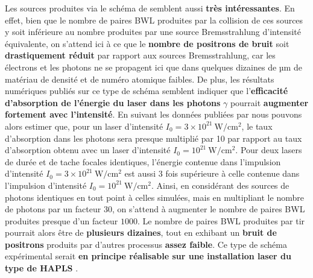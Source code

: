 \begin{refsection}
Les sources produites via le schéma de \cite{huang_2018} semblent aussi \textbf{très intéressantes}. En effet, bien que le nombre de paires BWL produites par la collision de ces sources y soit inférieure au nombre produites par une source Bremsstrahlung d'intensité équivalente, on s'attend ici à ce que le \textbf{nombre de positrons de bruit} soit \textbf{drastiquement réduit} par rapport aux sources Bremsstrahlung, car les électrons et les photons ne se propagent ici que dans quelques dizaines de µm de matériau de densité et de numéro atomique faibles.
De plus, les résultats numériques publiés sur ce type de schéma semblent indiquer que l'\textbf{efficacité d'absorption de l'énergie du laser dans les photons} $\gamma$ pourrait \textbf{augmenter fortement avec l'intensité}.
En suivant les données publiées par \cite{huang_2018} nous pouvons alors estimer que, pour un laser d'intensité $I_0 = 3 \times 10^{21} ~ \si{\W\per\cm^2}$, le taux d'absorption dans les photons sera presque multiplié par 10 par rapport au taux d'absorption obtenu avec un laser d'intensité $I_0 = 10^{21} ~ \si{\W\per\cm^2}$. Pour deux lasers de durée et de tache focales identiques, l'énergie contenue dans l'impulsion d'intensité $I_0 = 3 \times 10^{21} ~ \si{\W\per\cm^2}$ est aussi 3 fois supérieure à celle contenue dans l'impulsion d'intensité $I_0 = 10^{21} ~ \si{\W\per\cm^2}$.
Ainsi, en considérant des sources de photons identiques en tout point à celles simulées, mais en multipliant le nombre de photons par un facteur 30, on s'attend à augmenter le nombre de paires BWL produites presque d'un facteur $1000$. Le nombre de paires BWL produites par tir pourrait alors être de \textbf{plusieurs dizaines}, tout en exhibant un \textbf{bruit de positrons} produits par d'autres processus \textbf{assez faible}. Ce type de schéma expérimental serait \textbf{en principe réalisable sur une installation laser du type de HAPLS} \parencite{laser_hapls}.

\newpage
\printbibliography[heading=subbibintoc]
\end{refsection}